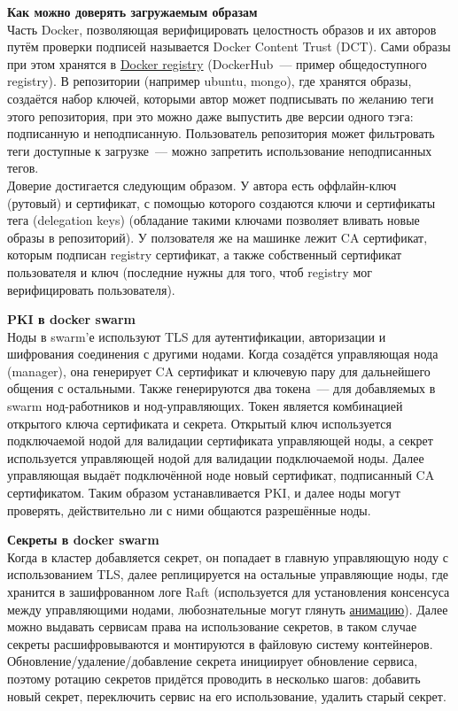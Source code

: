     \textbf{Как можно доверять загружаемым образам} ~\\
    Часть Docker, позволяющая верифицировать целостность образов и их авторов путём проверки подписей называется Docker Content Trust (DCT). Сами образы при этом хранятся в \href{https://docs.docker.com/registry/}{Docker registry} (DockerHub~--- пример общедоступного registry).
    В репозитории (например ubuntu, mongo), где хранятся образы, создаётся набор ключей, которыми автор может подписывать по желанию теги этого репозитория, при это можно даже выпустить две версии одного тэга:
    подписанную и неподписанную. Пользователь репозитория может фильтровать теги доступные к загрузке~--- можно запретить использование неподписанных тегов. ~\\
    Доверие достигается следующим образом. У автора есть оффлайн-ключ (рутовый) и сертификат, с помощью которого создаются ключи и сертификаты тега (delegation keys) (обладание такими ключами позволяет вливать новые образы в репозиторий). \autocite{DockerSecurityTrust} У ползователя же на машинке лежит
    CA сертификат, которым подписан registry сертификат, а также собственный сертификат пользователя и ключ (последние нужны для того, чтоб registry мог верифицировать пользователя). \autocite{DockerSecurityCertificates}

    \textbf{PKI в docker swarm} ~\\
    Ноды в swarm'е используют TLS для аутентификации, авторизации и шифрования соединения с другими нодами. Когда созадётся управляющая нода (manager), она генерирует CA сертификат и ключевую пару для
    дальнейшего общения с остальными. Также генерируются два токена~--- для добавляемых в swarm нод-работников и нод-управляющих. Токен является комбинацией открытого ключа сертификата и секрета. Открытый ключ используется подключаемой нодой для валидации сертификата управляющей ноды, а секрет
    используется управляющей нодой для валидации подключаемой ноды. Далее управляющая выдаёт подключённой ноде новый сертификат, подписанный CA сертификатом. Таким образом устанавливается PKI, и далее ноды могут проверять, действительно ли с ними общаются разрешённые ноды. \autocite{DockerSwarmPKI}

    \textbf{Секреты в docker swarm} ~\\
    Когда в кластер добавляется секрет, он попадает в главную управляющую ноду с использованием TLS, далее реплицируется на остальные управляющие ноды, где хранится в зашифрованном логе Raft (используется для установления консенсуса между управляющими нодами, любознательные могут
    глянуть \href{http://thesecretlivesofdata.com/raft/}{анимацию}). Далее можно выдавать сервисам права на использование секретов, в таком случае секреты расшифровываются и монтируются в файловую систему контейнеров. Обновление/удаление/добавление секрета инициирует обновление сервиса,
    поэтому ротацию секретов придётся проводить в несколько шагов: добавить новый секрет, переключить сервис на его использование, удалить старый секрет. \autocite{DockerSwarmSecrets}

